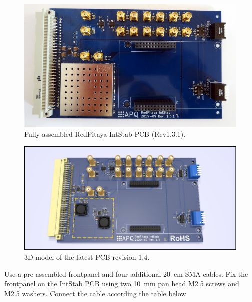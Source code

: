 \documentclass[twoside,a4paper]{refart}
\begin{document}
\begin{figure}[H]
	\includegraphics[width=\textwidth]{fig/PCB_intstab.png}
	\caption{Fully assembled RedPitaya IntStab PCB (Rev1.3.1).\label{fig:PCB}}
\end{figure}
\begin{figure}[H]
	\includegraphics[width=\textwidth]{fig/RedPitaya_IntStab.png}
	\caption{3D-model of the latest PCB revision 1.4.\label{fig:PCB_3D}}
\end{figure}

Use a pre assembled frontpanel and four additional \SI{20}{\centi\meter} SMA cables. Fix the frontpanel on the IntStab PCB using two \SI{10}{\milli\meter} pan head M2.5 screws and M2.5 washers. Connect the cable according the table below.
\end{document}
